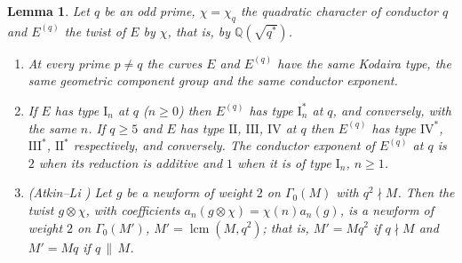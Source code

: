 \documentclass[11pt]{amsart}
\newtheorem{lemma}[theorem]{Lemma}
\theoremstyle{definition}
\newcommand{\Q}{\mathbb{Q}}
\begin{document}
\begin{lemma}\label{lem:twist}
Let $q$ be an odd prime, $\chi=\chi_q$ the quadratic character of conductor $q$ and $E^{(q)}$ the twist of $E$ by $\chi$, that is, by $\Q(\sqrt{q^*})$.
\begin{enumerate}
\item[(i)] At every prime $p\ne q$ the curves $E$ and $E^{(q)}$ have the same Kodaira type, the same geometric component group and the same conductor exponent.
\item[(ii)] If $E$ has type $\mathrm{I}_n$ at $q$ ($n\ge0$) then $E^{(q)}$ has type $\mathrm{I}_n^*$ at $q$, and conversely, with the same $n$. If $q\ge5$ and $E$ has type $\mathrm{II}$, $\mathrm{III}$, $\mathrm{IV}$ at $q$ then $E^{(q)}$ has type $\mathrm{IV}^*$, $\mathrm{III}^*$, $\mathrm{II}^*$ respectively, and conversely. The conductor exponent of $E^{(q)}$ at $q$ is $2$ when its reduction is additive and $1$ when it is of type $\mathrm{I}_n$, $n\ge1$.
\item[(iii)] (Atkin--Li \cite{AtkinLi78}) Let $g$ be a newform of weight $2$ on $\Gamma_0(M)$ with $q^2\nmid M$. Then the twist $g\otimes\chi$, with coefficients $a_n(g\otimes\chi)=\chi(n)a_n(g)$, is a newform of weight $2$ on $\Gamma_0(M')$, $M'=\operatorname{lcm}(M,q^2)$; that is, $M'=Mq^2$ if $q\nmid M$ and $M'=Mq$ if $q\,\|\,M$.
\end{enumerate}
\end{lemma}
\end{document}
